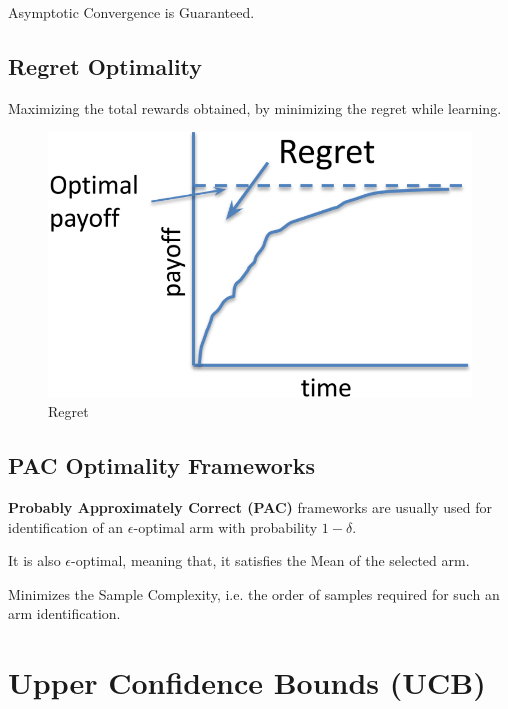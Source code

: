 \noindent Asymptotic Convergence is Guaranteed. 

\subsection{Regret Optimality}
Maximizing the total rewards obtained, by minimizing the regret while learning.
\begin{figure}[h]
    \centering
    \includegraphics[width=0.6\linewidth]{resources/img/Regret_Optim_01.png}
    \caption{Regret}
    \label{fig:Regret}
\end{figure}

\subsection{PAC Optimality Frameworks}
\textbf{Probably Approximately Correct (PAC)} frameworks are usually used for identification of an $\epsilon$-optimal arm with probability $1-\delta$.

\noindent It is also $\epsilon$-optimal, meaning that, it satisfies the Mean of the selected arm.

\noindent Minimizes the Sample Complexity, i.e. the order of samples required for such an arm identification.

\section{Upper Confidence Bounds (UCB)}

